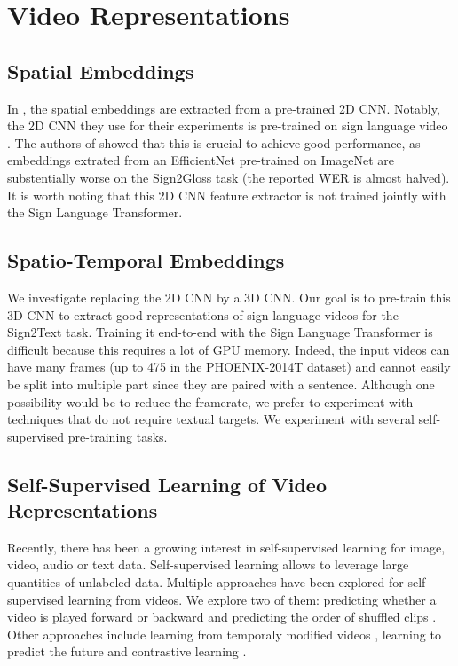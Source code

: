 \documentclass[final]{cvpr}
\begin{document}
\section{Video Representations}
\subsection{Spatial Embeddings}

In \cite{neccam}, the spatial embeddings are extracted from a pre-trained 2D CNN. Notably, the 2D CNN they use for their experiments is pre-trained on sign language video \cite{hmm}. The authors of \cite{neccam} showed that this is crucial to achieve good performance, as embeddings extrated from an EfficientNet \cite{effnet} pre-trained on ImageNet are substentially worse on the Sign2Gloss task (the reported WER is almost halved).
It is worth noting that this 2D CNN feature extractor is not trained jointly with the Sign Language Transformer.
\subsection{Spatio-Temporal Embeddings}
We investigate replacing the 2D CNN by a 3D CNN. Our goal is to pre-train this 3D CNN to extract good representations of sign language videos for the Sign2Text task. Training it end-to-end with the Sign Language Transformer is difficult because this requires a lot of GPU memory. Indeed, the input videos can have many frames (up to 475 in the PHOENIX-2014T \cite{phoenix} dataset) and cannot easily be split into multiple part since they are paired with a sentence. Although one possibility would be to reduce the framerate, we prefer to experiment with techniques that do not require textual targets. We experiment with several self-supervised pre-training tasks.
\subsection{Self-Supervised Learning of Video Representations}
Recently, there has been a growing interest in self-supervised learning for image, video, audio or text data. Self-supervised learning allows to leverage large quantities of unlabeled data. Multiple approaches have been explored for self-supervised learning from videos. We explore two of them: predicting whether a video is played forward or backward \cite{arrow} and predicting the order of shuffled clips \cite{vcop}. Other approaches include learning from temporaly modified videos \cite{playback-rate, pace, temp-trans}, learning to predict the future \cite{pred-coding} and contrastive learning \cite{bert-video}.
\end{document}
